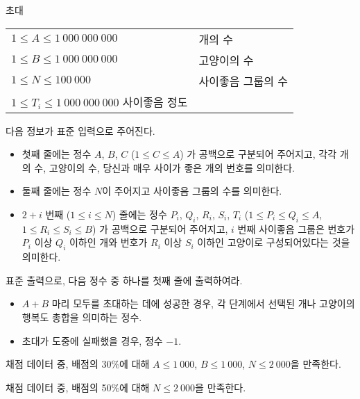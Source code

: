 \begin{problem}{초대}
	
	\begin{tabular}{ll}
		$1 \le A \le 1\ 000\ 000\ 000$ & 개의 수 \\
		$1 \le B \le 1\ 000\ 000\ 000$ & 고양이의 수 \\
		$1 \le N \le 100\ 000$ & 사이좋음 그룹의 수 \\
		$1 \le T_i \le 1\ 000\ 000\ 000$ 사이좋음 정도
	\end{tabular}
	
	
	\InputFile
	
	다음 정보가 표준 입력으로 주어진다.
	
	\begin{itemize}
		\item 첫째 줄에는 정수 $A$, $B$, $C$ ($1 \le C \le A$) 가 공백으로 구분되어 주어지고, 각각 개의 수, 고양이의 수, 당신과 매우 사이가 좋은 개의 번호를 의미한다.
		\item 둘째 줄에는 정수 $N$이 주어지고 사이좋음 그룹의 수를 의미한다.
		\item $2+i$ 번째 ($1 \le i \le N$) 줄에는 정수 $P_i$, $Q_i$, $R_i$, $S_i$, $T_i$ ($1 \le P_i \le Q_i \le A$, $1 \le R_i \le S_i \le B$) 가 공백으로 구분되어 주어지고, $i$ 번째 사이좋음 그룹은 번호가 $P_i$ 이상 $Q_i$ 이하인 개와 번호가 $R_i$ 이상 $S_i$ 이하인 고양이로 구성되어있다는 것을 의미한다.
	\end{itemize}
	
	
	
	\OutputFile
	
	표준 출력으로, 다음 정수 중 하나를 첫째 줄에 출력하여라.
	
	\begin{itemize}
		\item $A+B$ 마리 모두를 초대하는 데에 성공한 경우, 각 단계에서 선택된 개나 고양이의 행복도 총합을 의미하는 정수.
		\item 초대가 도중에 실패했을 경우, 정수 $-1$.
	\end{itemize}
	
	\Scoring
	
	채점 데이터 중, 배점의 30\%에 대해 $A \le 1\ 000$, $B \le 1\ 000$, $N \le 2\ 000$을 만족한다.
	
	채점 데이터 중, 배점의 50\%에 대해 $N \le 2\ 000$을 만족한다.
	
	\Examples
	
	\begin{example}
	\end{example}
	

\end{problem}
